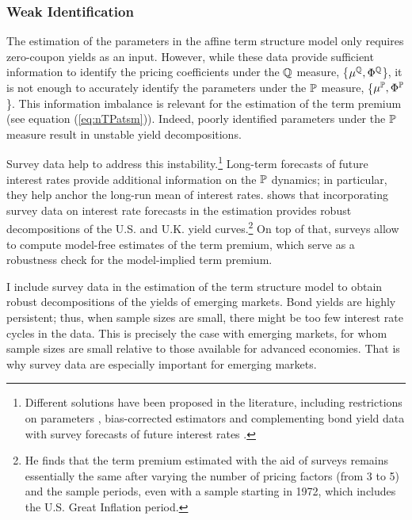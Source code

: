{\subsubsection{Weak Identification} \label{sec:Identification}
\iftoggle{toclinks}{\gototoc}{} %

The estimation of the parameters in the affine term structure model only requires zero-coupon yields as an input. 
However, while these data provide sufficient information to identify the pricing coefficients under the \(\mathbb{Q}\) measure, \{\(\mu^{\mathbb{Q}}, \Phi^{\mathbb{Q}}\)\}, it is not enough to accurately identify the parameters under the \(\mathbb{P}\) measure, \{\(\mu^{\mathbb{P}}, \Phi^{\mathbb{P}}\)\}. 
This information imbalance is relevant for the estimation of the term premium (see equation (\ref{eq:nTPatsm})). Indeed, poorly identified parameters under the \(\mathbb{P}\) measure result in unstable yield decompositions.

Survey data help to address this instability.\footnote{Different solutions have been proposed in the literature, including restrictions on parameters \citep{Duffee:2010}, bias-corrected estimators \citep{BRW:2012} and complementing bond yield data with survey forecasts of future interest rates \citep{KimWright:2005,KimOrphanides:2012}.} 
Long-term forecasts of future interest rates provide additional information on the \(\mathbb{P}\) dynamics; in particular, they help anchor the long-run mean of interest rates. 
\cite{Guimaraes:2014} shows that incorporating survey data on interest rate forecasts in the estimation provides robust decompositions of the U.S. and U.K. yield curves.\footnote{ He finds that the term premium estimated with the aid of surveys remains essentially the same after varying the number of pricing factors (from 3 to 5) and the sample periods, even with a sample starting in 1972, which includes the U.S. Great Inflation period.} 
On top of that, surveys allow to compute model-free estimates of the term premium, which serve as a robustness check for the model-implied term premium.

I include survey data in the estimation of the term structure model to obtain robust decompositions of the yields of emerging markets. 
Bond yields are highly persistent; thus, when sample sizes are small, there might be too few interest rate cycles in the data.
This is precisely the case with emerging markets, for whom sample sizes are small relative to those available for advanced economies. 
That is why survey data are especially important for emerging markets. 


}
